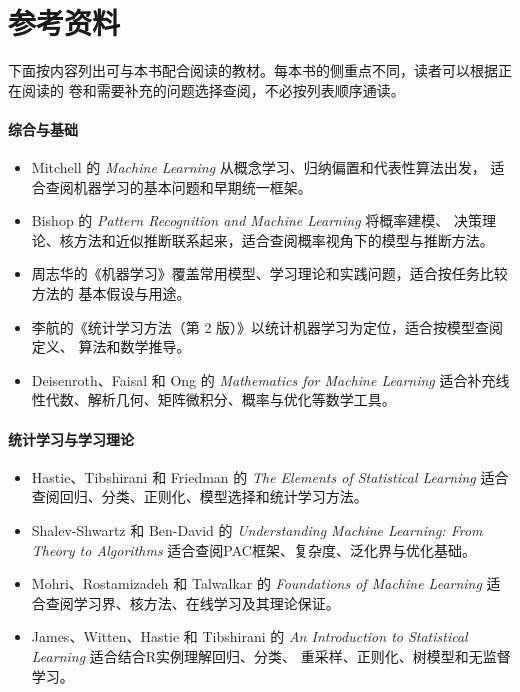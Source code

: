 \section*{参考资料}

下面按内容列出可与本书配合阅读的教材。每本书的侧重点不同，读者可以根据正在阅读的
卷和需要补充的问题选择查阅，不必按列表顺序通读。

\paragraph*{综合与基础}
\begin{itemize}
  \item Mitchell 的 \emph{Machine Learning} 从概念学习、归纳偏置和代表性算法出发，
    适合查阅机器学习的基本问题和早期统一框架。
  \item Bishop 的 \emph{Pattern Recognition and Machine Learning} 将概率建模、
    决策理论、核方法和近似推断联系起来，适合查阅概率视角下的模型与推断方法。
  \item 周志华的《机器学习》覆盖常用模型、学习理论和实践问题，适合按任务比较方法的
    基本假设与用途。
  \item 李航的《统计学习方法（第 2 版）》以统计机器学习为定位，适合按模型查阅定义、
    算法和数学推导。
  \item Deisenroth、Faisal 和 Ong 的 \emph{Mathematics for Machine Learning}
    适合补充线性代数、解析几何、矩阵微积分、概率与优化等数学工具。
\end{itemize}

\paragraph*{统计学习与学习理论}
\begin{itemize}
  \item Hastie、Tibshirani 和 Friedman 的 \emph{The Elements of Statistical
    Learning} 适合查阅回归、分类、正则化、模型选择和统计学习方法。
  \item Shalev-Shwartz 和 Ben-David 的 \emph{Understanding Machine Learning:
    From Theory to Algorithms} 适合查阅PAC框架、复杂度、泛化界与优化基础。
  \item Mohri、Rostamizadeh 和 Talwalkar 的 \emph{Foundations of Machine Learning}
    适合查阅学习界、核方法、在线学习及其理论保证。
  \item James、Witten、Hastie 和 Tibshirani 的
    \emph{An Introduction to Statistical Learning} 适合结合R实例理解回归、分类、
    重采样、正则化、树模型和无监督学习。
\end{itemize}

